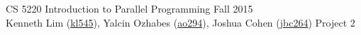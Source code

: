 \documentclass{scrartcl}
\begin{document}
  \begin{framed}
  CS 5220 Introduction to Parallel Programming \hfill Fall 2015 \\
  Kenneth Lim (\href{mailto:kl545@cornell.edu}{kl545}), Yalcin Ozhabes (\href{mailto:ao294@cornell.edu}{ao294}), Joshua Cohen (\href{mailto:jbc264@cornell.edu}{jbc264}) \hfill Project 2 \hspace{-3ex}
  \end{framed}
\end{document}
